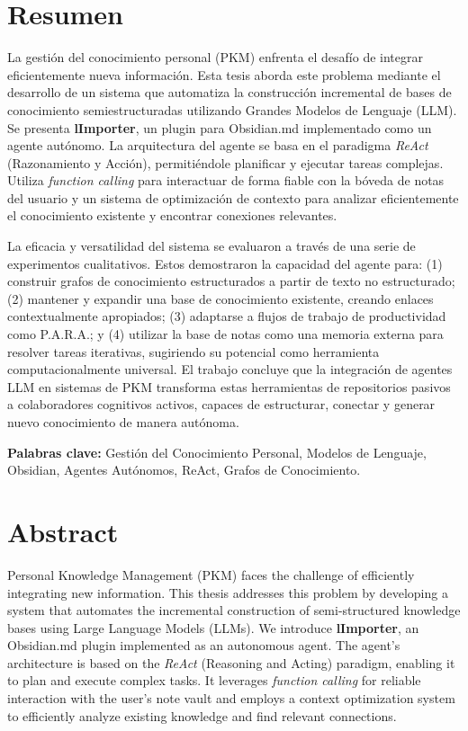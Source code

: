 \chapter*{Resumen}

La gestión del conocimiento personal (PKM) enfrenta el desafío de integrar eficientemente nueva información. Esta tesis aborda este problema mediante el desarrollo de un sistema que automatiza la construcción incremental de bases de conocimiento semiestructuradas utilizando Grandes Modelos de Lenguaje (LLM). Se presenta \textbf{lImporter}, un plugin para Obsidian.md implementado como un agente autónomo. La arquitectura del agente se basa en el paradigma \textit{ReAct} (Razonamiento y Acción), permitiéndole planificar y ejecutar tareas complejas. Utiliza \textit{function calling} para interactuar de forma fiable con la bóveda de notas del usuario y un sistema de optimización de contexto para analizar eficientemente el conocimiento existente y encontrar conexiones relevantes.

La eficacia y versatilidad del sistema se evaluaron a través de una serie de experimentos cualitativos. Estos demostraron la capacidad del agente para: (1) construir grafos de conocimiento estructurados a partir de texto no estructurado; (2) mantener y expandir una base de conocimiento existente, creando enlaces contextualmente apropiados; (3) adaptarse a flujos de trabajo de productividad como P.A.R.A.; y (4) utilizar la base de notas como una memoria externa para resolver tareas iterativas, sugiriendo su potencial como herramienta computacionalmente universal. El trabajo concluye que la integración de agentes LLM en sistemas de PKM transforma estas herramientas de repositorios pasivos a colaboradores cognitivos activos, capaces de estructurar, conectar y generar nuevo conocimiento de manera autónoma.

\vspace{1cm}
\textbf{Palabras clave:} Gestión del Conocimiento Personal, Modelos de Lenguaje, Obsidian, Agentes Autónomos, ReAct, Grafos de Conocimiento.

\chapter*{Abstract}

Personal Knowledge Management (PKM) faces the challenge of efficiently integrating new information. This thesis addresses this problem by developing a system that automates the incremental construction of semi-structured knowledge bases using Large Language Models (LLMs). We introduce \textbf{lImporter}, an Obsidian.md plugin implemented as an autonomous agent. The agent's architecture is based on the \textit{ReAct} (Reasoning and Acting) paradigm, enabling it to plan and execute complex tasks. It leverages \textit{function calling} for reliable interaction with the user's note vault and employs a context optimization system to efficiently analyze existing knowledge and find relevant connections.

